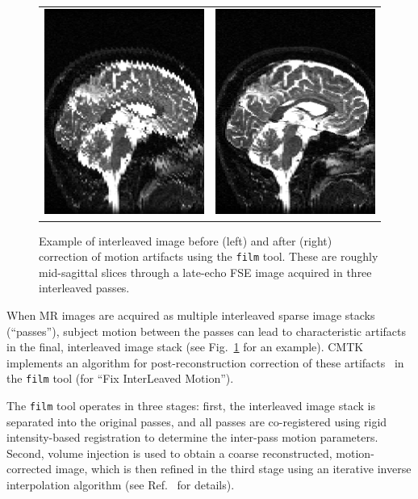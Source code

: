 \documentclass{InsightArticle}
\begin{document}
\begin{figure}[tbp]
\begin{center}
\begin{tabular}{cc}
\includegraphics[width=.3\linewidth]{img/film_artifacts}&
\includegraphics[width=.3\linewidth]{img/film_corrected}
\end{tabular}
\end{center}
\caption{Example of interleaved image before (left) and after (right)
  correction of motion artifacts using the {\tt film} tool. These are roughly
  mid-sagittal slices through a late-echo FSE image acquired in three
  interleaved passes.}
\label{fig:InterleavedExample}
\end{figure}

When MR images are acquired as multiple interleaved sparse image stacks
(``passes''), subject motion between the passes can lead to characteristic
artifacts in the final, interleaved image stack (see
Fig.~\ref{fig:InterleavedExample} for an example). CMTK implements an
algorithm for post-reconstruction correction of these
artifacts~\cite{RohlRadePfef:2008a} in the \verb|film| tool (for ``Fix
InterLeaved Motion'').

The \verb|film| tool operates in three stages: first, the interleaved image
stack is separated into the original passes, and all passes are co-registered
using rigid intensity-based registration to determine the inter-pass motion
parameters. Second, volume injection is used to obtain a coarse reconstructed,
motion-corrected image, which is then refined in the third stage using an
iterative inverse interpolation algorithm (see Ref.~\cite{RohlRadePfef:2008a}
for details).
\end{document}
